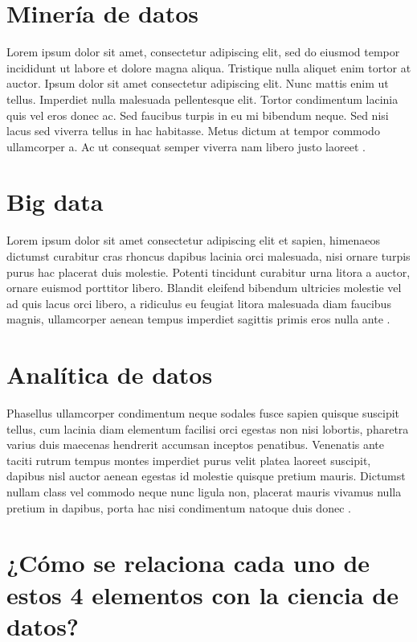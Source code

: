 \documentclass[12pt]{article}
\begin{document}
\section{Minería de datos}

Lorem ipsum dolor sit amet, consectetur adipiscing elit, sed do eiusmod tempor incididunt ut labore et dolore magna aliqua. Tristique nulla aliquet enim tortor at auctor. Ipsum dolor sit amet consectetur adipiscing elit. Nunc mattis enim ut tellus. Imperdiet nulla malesuada pellentesque elit. Tortor condimentum lacinia quis vel eros donec ac. Sed faucibus turpis in eu mi bibendum neque. Sed nisi lacus sed viverra tellus in hac habitasse. Metus dictum at tempor commodo ullamcorper a. Ac ut consequat semper viverra nam libero justo laoreet \cite{1}. \\

\section{Big data}
Lorem ipsum dolor sit amet consectetur adipiscing elit et sapien, himenaeos dictumst curabitur cras rhoncus dapibus lacinia orci malesuada, nisi ornare turpis purus hac placerat duis molestie. Potenti tincidunt curabitur urna litora a auctor, ornare euismod porttitor libero. Blandit eleifend bibendum ultricies molestie vel ad quis lacus orci libero, a ridiculus eu feugiat litora malesuada diam faucibus magnis, ullamcorper aenean tempus imperdiet sagittis primis eros nulla ante \cite{1}.


\section{Analítica de datos}

Phasellus ullamcorper condimentum neque sodales fusce sapien quisque suscipit tellus, cum lacinia diam elementum facilisi orci egestas non nisi lobortis, pharetra varius duis maecenas hendrerit accumsan inceptos penatibus. Venenatis ante taciti rutrum tempus montes imperdiet purus velit platea laoreet suscipit, dapibus nisl auctor aenean egestas id molestie quisque pretium mauris. Dictumst nullam class vel commodo neque nunc ligula non, placerat mauris vivamus nulla pretium in dapibus, porta hac nisi condimentum natoque duis donec \cite{2}. 


\section{¿Cómo se relaciona cada uno de estos 4 elementos con la ciencia de datos?}
\end{document}
